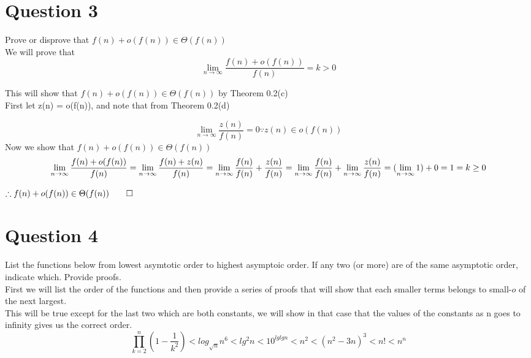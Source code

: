 \documentclass{article}
\begin{document}
  \section{Question 3}
  \begin{center}Prove or disprove that $f(n) + o(f(n)) \in \Theta(f(n))$ \\
  We will prove that \[\lim_{n \to \infty} \frac{f(n) + o(f(n))}{f(n)} = k > 0 \] \end{center}
    
  \begin{center} This will show that $f(n) + o(f(n)) \in \Theta(f(n))$ by Theorem 0.2(c) \\
  First let z(n) = o(f(n)), and note that from Theorem 0.2(d) \end{center}
  \[\lim_{n \to \infty} \frac{z(n)}{f(n)} = 0  \because z(n) \in o(f(n))\]
  Now we show that $f(n) + o(f(n)) \in \Theta(f(n))$ \\
    \[\lim_{n \to \infty} \frac{f(n) + o(f(n))}{f(n)} \\
      = \lim_{n \to \infty} \frac{f(n) + z(n)}{f(n)}  \\
      = \lim_{n \to \infty} \frac{f(n)}{f(n)} + \frac{z(n)}{f(n)} \\
      = \lim_{n \to \infty} \frac{f(n)}{f(n)} + \lim_{n \to \infty} \frac{z(n)}{f(n)} \\
      = (\lim_{n \to \infty} 1) + 0 \\
      = 1
      = k \geq 0
    \]
  \begin{center}$\therefore f(n) + o(f(n)) \in \Theta(f(n)) \qed$\end{center}
    \section{Question 4}
      List the functions below from lowest asymtotic order to highest asymptoic order. If any two (or more) are of the same asymptotic order, indicate which. Provide proofs. \\
      First we will list the order of the functions and then provide a series of proofs that will show that each smaller terms belongs to small-$o$ of the next largest. \\
      This will be true except for the last two which are both constants, we will show in that case that the values of the constants as n goes to infinity gives us the correct order. \\

      \[\prod_{k=2}^{n}(1 - \frac{1}{k^{2}}) < log_{\sqrt{n}} n^{6} < lg^{2} n < 10^{lg lg n} < n^{2} < (n^{2} - 3n)^{3} < n! < n^{n} \]
\end{document}
